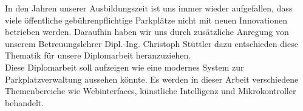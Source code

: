 In den Jahren unserer Ausbildungszeit ist uns immer wieder aufgefallen, dass viele öffentliche gebührenpflichtige Parkplätze nicht mit neuen Innovationen betrieben werden. 
Daraufhin haben wir uns durch zusätzliche Anregung von unserem Betreuungslehrer Dipl.-Ing. Christoph Stüttler dazu entschieden diese Thematik für unsere Diplomarbeit heranzuziehen.\\

Diese Diplomarbeit soll aufzeigen wie eine modernes System zur Parkplatzverwaltung aussehen könnte. Es werden in dieser Arbeit verschiedene Themenbereiche wie Webinterfaces, künstliche Intelligenz und Mikrokontroller behandelt.